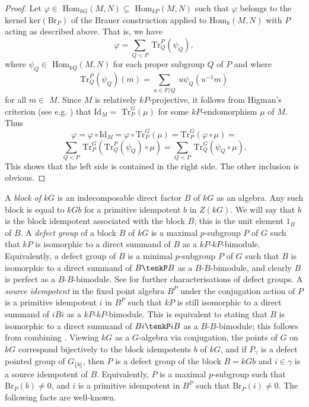 \documentclass{amsart}
\theoremstyle{plain}\newtheorem{Theorem}{Theorem}[section]
\theoremstyle{plain}\newtheorem{Conjecture}[Theorem]{Conjecture}
\theoremstyle{plain}\newtheorem{Corollary}[Theorem]{Corollary}
\theoremstyle{plain}\newtheorem{Lemma}[Theorem]{Lemma}
\theoremstyle{plain}\newtheorem{Proposition}[Theorem]{Proposition}
\theoremstyle{definition}\newtheorem{Definition}[Theorem]{Definition}
\theoremstyle{definition}\newtheorem{Example}[Theorem]{Example}
\theoremstyle{definition}\newtheorem{Examples}[Theorem]{Examples}
\theoremstyle{definition}\newtheorem{Exercise}[Theorem]{Exercise}
\theoremstyle{definition}\newtheorem{Notation}[Theorem]{Notation}
\theoremstyle{definition}\newtheorem{Remark}[Theorem]{Remark}
\theoremstyle{definition}\newtheorem{Remarks}[Theorem]{Remarks}
\theoremstyle{plain}\newtheorem{Statement}[Theorem]{}
\def\Br{\mathrm{Br}}                 \def\ten{\otimes}
\def\Hom{\mathrm{Hom}}           \def\tenkS{\otimes_{kS}}
\def\ker{\mathrm{ker}}           \def\tenkT{\otimes_{kT}}
\def\Id{\mathrm{Id}}
\def\Tr{\mathrm{Tr}}             \def\tenOT{\otimes_{\mathcal{O}T}}
\begin{document}
\begin{proof}
Let $\varphi\in$ $\Hom_{kG}(M,N)\subseteq$ $\Hom_{kP}(M,N)$ such that 
$\varphi$ belongs to the kernel $\ker(\Br_P)$ of the Brauer construction 
applied to $\Hom_k(M,N)$ with $P$ acting as described above. That is, we have
$$\varphi = \sum_{Q<P}\ \Tr^P_Q(\psi_Q), $$
where $\psi_Q\in$ $\Hom_{kQ}(M,N)$ for each proper subgroup $Q$ of $P$
and where 
$$\Tr^P_Q(\psi_Q)(m)= \sum_{u\in P/Q}\ u\psi_Q(u^{-1}m)$$
for all $m\in $ $M$. Since $M$ is relatively $kP$-projective, it follows from
Higman's criterion (see e.g. \cite[Theorem 2.6.2]{LiBookI}) that $\Id_M=$
$\Tr^G_P(\mu)$ for some $kP$-endomorphism $\mu$ of $M$.
Thus
$$\varphi = \varphi\circ\Id_M = \varphi \circ \Tr^G_P(\mu) =
\Tr^G_P(\varphi\circ\mu) = $$
$$\sum_{Q<P}\ \Tr^G_P(\Tr^P_Q(\psi_Q)\circ\mu) =
\sum_{Q<P}\ \Tr^G_Q(\psi_Q\circ\mu).$$
This shows that the left side is contained in the right side. The other
inclusion is obvious.
\end{proof}

A {\em block of} $kG$ is an indecomposable direct factor $B$ of
$kG$ as an algebra. Any such block is equal to $kGb$ for a primitive idempotent 
$b$ in $Z(kG)$. We will say that $b$ is the block idempotent associated with the 
block $B$; this is the unit element $1_B$ of $B$.
A {\em defect group} of a block $B$ of $kG$  is a maximal $p$-subgroup $P$ of 
$G$ such that $kP$ is isomorphic to a direct summand of $B$ as a 
$kP$-$kP$-bimodule.  Equivalently, a defect group of $B$ is a minimal 
$p$-subgroup $P$ of $G$ such that $B$ is isomorphic to a direct summand of 
$B\tenkP B$ as a $B$-$B$-bimodule, and clearly $B$ is perfect as a 
$B$-$B$-bimodule. 
See \cite[Theorem 6.2.1]{LiBookII} for further  characterisations of
defect groups. A {\em source idempotent} in the fixed point algebra $B^P$ under 
the conjugation action of $P$ is a primitive idempotent $i$ in $B^P$ such that 
$kP$ is still isomorphic to a direct summand of $iBi$ as a $kP$-$kP$-bimodule. 
This is equivalent to stating that $B$ is isomorphic to a direct summand of 
$Bi\tenkP iB$ as a  $B$-$B$-bimodule; this follows from combining 
\cite[Theorem 6.4.6, Theorem 6.4.7]{LiBookII}.   Viewing  $kG$ as a $G$-algebra  
via conjugation,  the points of $G$ on $kG$ correspond bijectively to the block
idempotents $b$ of $kG$, and if $P_\gamma$ is  a defect pointed group of 
$G_{\{b\}}$, then $P$ is a defect group of the block $B=kGb$ and $i\in \gamma$ is a
source idempotent of $B$.  Equivalently,  $P$ is a maximal $p$-subgroup
such that $\Br_P(b)\neq 0$, and $i$ is a primitive  idempotent in $B^P$ such that
$\Br_P(i)\neq 0$.   The following facts are
well-known.
\end{document}
